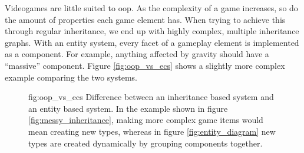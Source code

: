 Videogames are little suited to \ac{oop}.
As the complexity of a game increases,
so do the amount of properties each game element has.
When trying to achieve this through regular inheritance,
we end up with highly complex, multiple inheritance graphs.
With an entity system, every facet of a gameplay element is implemented as a component.
For example, anything affected by gravity should have a ``massive'' component.
Figure \ref{fig:oop_vs_ecs} shows a slightly more complex example comparing the two systems.

\begin{figure}
  [Object oriented programming vs entity based programming]
  {fig:oop_vs_ecs}
  {
    Difference between an inheritance based system and an entity based system.
    In the example shown in figure \ref{fig:messy_inheritance},
    making more complex game items would mean creating new types,
    whereas in figure \ref{fig:entity_diagram} new types are created dynamically by grouping components together.
  }

\end{figure}
